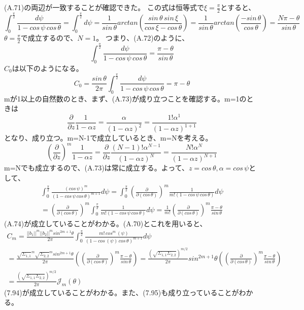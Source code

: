 \documentclass{jsarticle}
\begin{document}
(A.71)の両辺が一致することが確認できた。
この式は恒等式で$\xi = \frac{\pi}{2}$とすると、
\begin{equation}
\int_0^{\frac{\pi}{2}} \frac{d\psi}{1-cos\,\psi\,cos\,\theta} = \int_0^{\frac{\pi}{2}} d\psi
= \frac{1}{sin\,\theta}arctan(\frac{sin\,\theta\,sin\,\xi}{cos\,\xi - cos\,\theta})
= \frac{1}{sin\,\theta}arctan(\frac{-sin\,\theta}{cos\,\theta})
= \frac{N\pi - \theta}{sin\,\theta}
\end{equation}
$\theta = \frac{\pi}{2}$で成立するので、$N=1$。
つまり、(A.72)のように、
\begin{equation}
\int_0^{\frac{\pi}{2}} \frac{d\psi}{1-cos\,\psi\,cos\,\theta}
= \frac{\pi - \theta}{sin\,\theta}
\end{equation}
$C_0$は以下のようになる。
\begin{equation}
C_0 = \frac{sin\,\theta}{2\pi}\int_0^{\frac{\pi}{2}} \frac{d\psi}{1-cos\,\psi\,cos\,\theta} = \pi - \theta
\end{equation}
mが1以上の自然数のとき、まず、(A.73)が成り立つことを確認する。m=1のときは
\begin{equation}
\frac{\partial}{\partial z}\frac{1}{1 - \alpha z} = \frac{\alpha}{(1 - \alpha z)^2} = \frac{1!\alpha^1}{(1 - \alpha z)^{1+1}}
\end{equation}
となり、成り立つ。m=N-1で成立しているとき、m=Nを考える。
\begin{equation}
(\frac{\partial}{\partial z})^m \frac{1}{1 - \alpha z} = \frac{\partial}{\partial z} \frac{(N-1)!\alpha^{N-1}}{(1 - \alpha z)^{N}} = \frac{N!\alpha^N}{(1 - \alpha z)^{N+1}}
\end{equation}
m=Nでも成立するので、(A.73)は常に成立する。よって、$z = cos\,\theta, \alpha = cos\,\psi$として、
\begin{equation}
\begin{split}
\int_0^{\frac{\pi}{2}} \frac{(cos\,\psi)^m}{(1-cos\,\psi\,cos\,\theta)^{m+1}}d\psi
=\int_0^{\frac{\pi}{2}} (\frac{\partial}{\partial (cos\,\theta)})^m\frac{1}{m!(1-cos\,\psi\,cos\,\theta)}d\psi\\
=(\frac{\partial}{\partial (cos\,\theta)})^m \int_0^{\frac{\pi}{2}} \frac{1}{m!(1-cos\,\psi\,cos\,\theta)}d\psi
=\frac{1}{m!}(\frac{\partial}{\partial (cos\,\theta)})^m \frac{\pi - \theta}{sin\,\theta}
\end{split}
\end{equation}
(A.74)が成立していることがわかる。(A.70)とこれを用いると、
\begin{equation}
\begin{split}
C_m = \frac{||b_1||^m ||b_2||^m  sin^{2m+1}\theta}{2\pi} \int_{0}^{\frac{\pi}{2}} \frac{m!\,cos^{m}\,(\psi)}{(1- cos\,(\psi) \,cos\,\theta)^{m+1}} d\psi\\
= \frac{\sqrt{\Sigma_{1,1}}^m \sqrt{\Sigma_{2,2}}^m  sin^{2m+1}\theta}{2\pi} ((\frac{\partial}{\partial (cos\,\theta)})^m \frac{\pi - \theta}{sin\,\theta})
= \frac{(\sqrt{\Sigma_{1,1}\Sigma_{2,2}})^{m/2}  }{2\pi} sin^{2m+1}\theta ((\frac{\partial}{\partial (cos\,\theta)})^m \frac{\pi - \theta}{sin\,\theta})\\
= \frac{(\sqrt{\Sigma_{1,1}\Sigma_{2,2}})^{m/2}  }{2\pi} \mathcal{J}_m(\theta)
\end{split}
\end{equation}
(7.94)が成立していることがわかる。また、(7.95)も成り立っていることがわかる。
\end{document}

